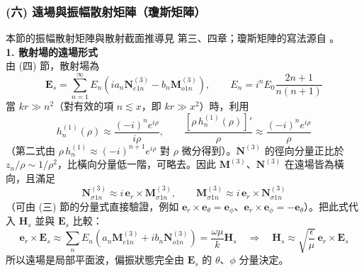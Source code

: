 
\subsubsection*{(六) 遠場與振幅散射矩陣（瓊斯矩陣）}
本節的振幅散射矩陣與散射截面推導見 \textcite{bohren1983Absorption} 第三、四章；瓊斯矩陣的寫法源自 \textcite{jones1941NewCalculus}。\\

\textbf{1. 散射場的遠場形式}\\
由 (四) 節，散射場為
\begin{equation}
    \mathbf{E}_s = \sum_{n=1}^{\infty} E_n \left( i a_n \mathbf{N}^{(3)}_{e1n} - b_n \mathbf{M}^{(3)}_{o1n} \right), \qquad E_n = i^n E_0 \frac{2n+1}{n(n+1)}
\end{equation}
當 $kr \gg n^2$（對有效的項 $n \lesssim x$，即 $kr \gg x^2$）時，利用
\begin{equation}
    h_n^{(1)}(\rho) \approx \frac{(-i)^n e^{i\rho}}{i\rho}, \qquad \frac{\left[\rho\, h_n^{(1)}(\rho)\right]'}{\rho} \approx \frac{(-i)^n e^{i\rho}}{\rho}
\end{equation}
（第二式由 $\rho\, h_n^{(1)} \approx (-i)^{n+1} e^{i\rho}$ 對 $\rho$ 微分得到）。$\mathbf{N}^{(3)}$ 的徑向分量正比於 $z_n/\rho \sim 1/\rho^2$，比橫向分量低一階，可略去。因此 $\mathbf{M}^{(3)}$、$\mathbf{N}^{(3)}$ 在遠場皆為橫向，且滿足
\begin{equation}
    \mathbf{N}^{(3)}_{\sigma 1n} \approx i\, \mathbf{e}_r \times \mathbf{M}^{(3)}_{\sigma 1n}, \qquad \mathbf{M}^{(3)}_{\sigma 1n} \approx i\, \mathbf{e}_r \times \mathbf{N}^{(3)}_{\sigma 1n} \label{eq:far_rel}
\end{equation}
（可由 (三) 節的分量式直接驗證，例如 $\mathbf{e}_r \times \mathbf{e}_{\theta} = \mathbf{e}_{\phi}$、$\mathbf{e}_r \times \mathbf{e}_{\phi} = -\mathbf{e}_{\theta}$）。把此式代入 $\mathbf{H}_s$ 並與 $\mathbf{E}_s$ 比較：
\begin{equation}
    \mathbf{e}_r \times \mathbf{E}_s \approx \sum_n E_n \left( a_n \mathbf{M}^{(3)}_{e1n} + i b_n \mathbf{N}^{(3)}_{o1n} \right) = \frac{\omega\mu}{k} \mathbf{H}_s \quad \Rightarrow \quad \mathbf{H}_s \approx \sqrt{\frac{\epsilon}{\mu}}\, \mathbf{e}_r \times \mathbf{E}_s
\end{equation}
所以遠場是局部平面波，偏振狀態完全由 $\mathbf{E}_s$ 的 $\theta$、$\phi$ 分量決定。

